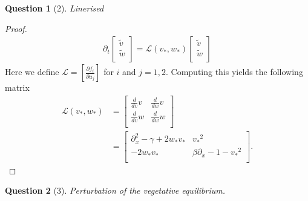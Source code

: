 \documentclass[11pt]{article}
\theoremstyle{quest}
\newtheorem*{question}{Question}
\newcommand{\Dp}{\partial}
\begin{document}
\clearpage

\begin{question}[2]
    Linerised 
\end{question}
\begin{proof}
    \begin{align*}
        \Dp_t
        \begin{bmatrix}
            \tilde{v} \\
            \tilde{w} \\
        \end{bmatrix}  = 
        \mathcal{L} \left( v_*, w_* \right)
        \begin{bmatrix}
            \tilde{v} \\
            \tilde{w} \\
        \end{bmatrix}   
    \end{align*}
    Here we define $\mathcal{L} = \left[ \frac{\Dp f_i }{ \Dp u_j } \right]$ for $i$ and $j=1,2$. 
    Computing this yields the following matrix 
    \begin{align*}
        \mathcal{L} \left( v_*, w_* \right)  &=
        \begin{bmatrix}
            \frac{d}{dv} v & \frac{d}{dw} v \\
            \frac{d}{dv} w & \frac{d}{dw} w \\
        \end{bmatrix} \\
        &=
        \begin{bmatrix}
            \Dp_{x}^{2} - \gamma + 2 w_* v_* & {v_*}^2 \\
            -2w_* v_* & \beta \Dp_x -1 - {v_*}^2 \\
        \end{bmatrix}
        .
    \end{align*}
\end{proof}
\clearpage
\begin{question}[3]
    Perturbation of the vegetative equilibrium. 
\end{question}
\end{document}
